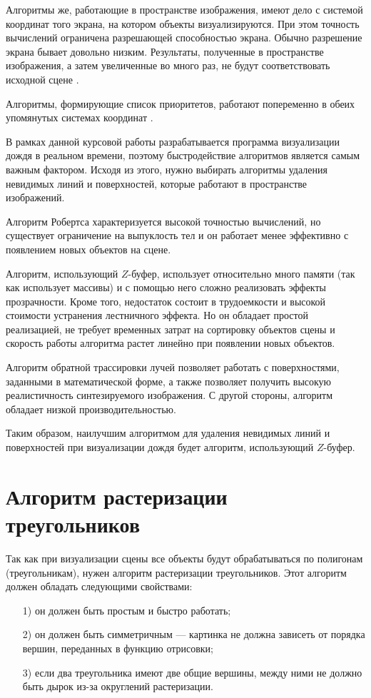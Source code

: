 Алгоритмы же, работающие в пространстве изображения, имеют дело с системой координат того экрана, на котором объекты визуализируются. 
При этом точность вычислений ограничена разрешающей способностью экрана. Обычно разрешение экрана бывает довольно низким. 
Результаты, полученные в пространстве изображения, а затем увеличенные во много раз, не будут соответствовать исходной сцене \cite{Demin2005}.

Алгоритмы, формирующие список приоритетов, работают попеременно в обеих упомянутых системах координат \cite{Demin2005}.

В рамках данной курсовой работы разрабатывается программа визуализации дождя в реальном времени, поэтому быстродействие алгоритмов является самым важным фактором. Исходя из этого, нужно выбирать алгоритмы удаления невидимых линий и поверхностей, которые работают в пространстве изображений.

Алгоритм Робертса характеризуется высокой точностью вычислений, но существует ограничение на выпуклость тел и он работает менее эффективно с появлением новых объектов на сцене.

Алгоритм, использующий $Z$-буфер, использует относительно много памяти (так как использует массивы) и с помощью него сложно реализовать эффекты прозрачности. 
Кроме того, недостаток состоит в трудоемкости и высокой стоимости устранения лестничного эффекта. 
Но он обладает простой реализацией, не требует временных затрат на сортировку объектов сцены и скорость работы алгоритма растет линейно при появлении новых объектов.

Алгоритм обратной трассировки лучей позволяет работать с поверхностями, заданными в математической форме, а также позволяет получить высокую реалистичность синтезируемого изображения. 
С другой стороны, алгоритм обладает низкой производительностью.

Таким образом, наилучшим алгоритмом для удаления невидимых линий и поверхностей при визуализации дождя будет алгоритм, использующий $Z$-буфер.

\section{Алгоритм растеризации треугольников}

Так как при визуализации сцены все объекты будут обрабатываться по полигонам (треугольникам), нужен алгоритм растеризации треугольников. 
Этот алгоритм должен обладать следующими свойствами:
\begin{enumerate}
\item[1)] он должен быть простым и быстро работать;
\item[2)] он должен быть симметричным --- картинка не должна зависеть от порядка вершин, переданных в функцию отрисовки;
\item[3)] если два треугольника имеют две общие вершины, между ними не должно быть дырок из-за округлений растеризации.
\end{enumerate}


